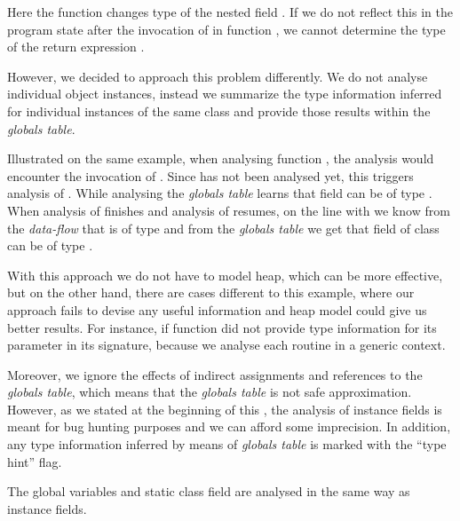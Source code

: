         Here the function  changes type of the nested field 
        . If we do not reflect this in the program 
        state after the invocation of  in 
        function , we cannot determine the type of 
        the return expression .
        
        However, we decided to approach this problem differently. 
        We do not analyse individual object instances, 
        instead we summarize the type information inferred 
        for individual instances of the same class and provide 
        those results within the \emph{globals table}.
        
        Illustrated on the same example, when analysing function 
        , the analysis would encounter the invocation 
        of . Since  has not been analysed yet, 
        this triggers analysis of . While analysing 
         the \emph{globals table} learns that 
        field  can be of type . When analysis 
        of  finishes and analysis of  resumes, 
        on the line with  we know from the 
        \emph{data-flow} that  is of type  and 
        from the \emph{globals table} we get that field  
        of class  can be of type .
        
        With this approach we do not have to model heap, 
        which can be more effective, but on the other hand, 
        there are cases different to this example, where our 
        approach fails to devise any useful information 
        and heap model could give us better results. 
        For instance, if function  
        did not provide type information for its parameter 
        in its signature, because we analyse each routine 
        in a generic context.
                
        Moreover, we ignore the effects of indirect assignments 
        and references to the \emph{globals table}, which means 
        that the \emph{globals table} is not safe approximation. 
        However, as we stated at the beginning of this \wsection{}, 
        the analysis of instance fields is meant for bug hunting 
        purposes and we can afford some imprecision. In addition, 
        any type information inferred by means of \emph{globals table} 
        is marked with the ``type hint'' flag.
        
        The global variables and static class field are analysed 
        in the same way as instance fields.
        
